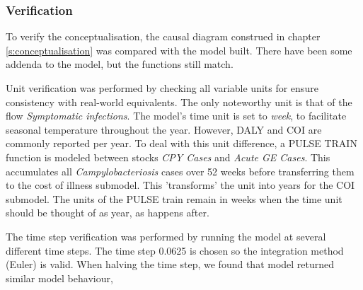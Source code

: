 \subsubsection{Verification}
\label{s:verification}

    
To verify the conceptualisation, the causal diagram construed in chapter \ref{s:conceptualisation} was compared with the model built. There have been some addenda to the model, but the functions still match.  
    
Unit verification was performed by checking all variable units for ensure consistency with real-world equivalents. The only noteworthy unit is that of the flow \textit{Symptomatic infections}. The model's time unit is set to \textit{week}, to facilitate seasonal temperature throughout the year. However, DALY and COI are commonly reported per year. To deal with this unit difference, a PULSE TRAIN function is modeled between stocks \textit{CPY Cases} and \textit{Acute GE Cases}. This accumulates all \textit{Campylobacteriosis} cases over 52 weeks before transferring them to the cost of illness submodel. This 'transforms' the unit into years for the COI submodel. The units of the PULSE train remain in weeks when the time unit should be thought of as year, as happens after. 
    
The time step verification was performed by running the model at several different time steps. The time step 0.0625 is chosen so the integration method (Euler) is valid. When halving the time step, we found that model returned similar model behaviour, 


